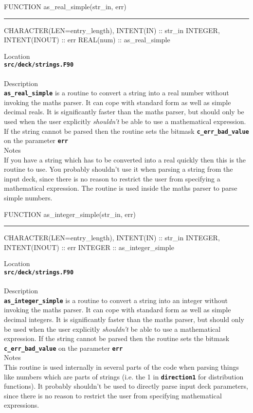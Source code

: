 \documentclass[12pt,a4paper]{article}
\newcommand{\HRule}{\rule[0.3cm]{\linewidth}{0.5mm}}
\newcommand{\inlinecode}[1]{{\color{warwickred} \bf\texttt{#1}}}
\begin{document}
\pagebreak
\begin{codedef}
FUNCTION as_real_simple(str_in, err)
\HRule
CHARACTER(LEN=entry_length), INTENT(IN) :: str_in
INTEGER, INTENT(INOUT) :: err
REAL(num) :: as_real_simple
\end{codedef}
\vspace{1cm}
{\Large Location\\}
\inlinecode{src/deck/strings.F90}\\
\\[0.5cm]
{\Large Description\\}
\inlinecode{as\_real\_simple} is a routine to convert a string into a real
number without invoking the maths parser. It can cope with standard form as
well as simple decimal reals. It is significantly faster than the maths parser,
but should only be used when the user explicitly {\it shouldn't} be able to use
a mathematical expression. If the string cannot be parsed then the routine sets
the bitmask \inlinecode{c\_err\_bad\_value} on the parameter \inlinecode{err}
\\[0.5cm]
{\Large Notes\\}
If you have a string which has to be converted into a real quickly then this is
the routine to use. You probably shouldn't use it when parsing a string from
the input deck, since there is no reason to restrict the user from specifying a
mathematical expression. The routine is used inside the maths parser to parse
simple numbers.

\pagebreak
\begin{codedef}
FUNCTION as_integer_simple(str_in, err)
\HRule
CHARACTER(LEN=entry_length), INTENT(IN) :: str_in
INTEGER, INTENT(INOUT) :: err
INTEGER :: as_integer_simple
\end{codedef}
\vspace{1cm}
{\Large Location\\}
\inlinecode{src/deck/strings.F90}\\
\\[0.5cm]
{\Large Description\\}
\inlinecode{as\_integer\_simple} is a routine to convert a string into an
integer without invoking the maths parser. It can cope with standard form as
well as simple decimal integers. It is significantly faster than the maths
parser, but should only be used when the user explicitly {\it shouldn't} be
able to use a mathematical expression. If the string cannot be parsed then the
routine sets the bitmask \inlinecode{c\_err\_bad\_value} on the parameter
\inlinecode{err}
\\[0.5cm]
{\Large Notes\\}
This routine is used internally in several parts of the code when parsing
things like numbers which are parts of strings (i.e. the 1 in
\inlinecode{direction1} for distribution functions). It probably shouldn't
be used to directly parse input deck parameters, since there is no reason to
restrict the user from specifying mathematical expressions.
\end{document}
